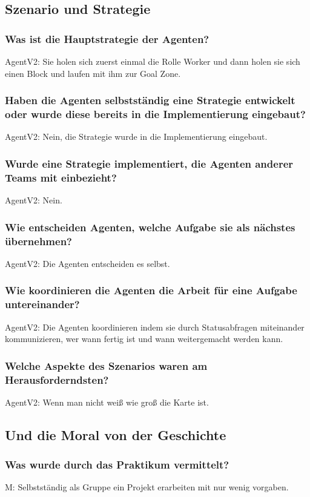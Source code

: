 \documentclass[runningheads]{llncs}
\begin{document}
\subsection{Szenario und Strategie}
\subsubsection{Was ist die Hauptstrategie der Agenten?\\}
AgentV2: Sie holen sich zuerst einmal die Rolle Worker und dann holen sie sich einen Block und laufen mit ihm zur Goal Zone.
\subsubsection{Haben die Agenten selbstständig eine Strategie entwickelt oder wurde diese bereits in die Implementierung eingebaut?\\}
AgentV2: Nein, die Strategie wurde in die Implementierung eingebaut.
\subsubsection{Wurde eine Strategie implementiert, die Agenten anderer Teams mit einbezieht?\\}
AgentV2: Nein.
\subsubsection{Wie entscheiden Agenten, welche Aufgabe sie als nächstes übernehmen?\\}
AgentV2: Die Agenten entscheiden es selbst.
\subsubsection{Wie koordinieren die Agenten die Arbeit für eine Aufgabe untereinander?\\}
AgentV2: Die Agenten koordinieren indem sie durch Statusabfragen miteinander kommunizieren, wer wann fertig ist und wann weitergemacht werden kann. 
\subsubsection{Welche Aspekte des Szenarios waren am Herausforderndsten?\\}
AgentV2: Wenn man nicht weiß wie groß die Karte ist.
\subsection{Und die Moral von der Geschichte}
\subsubsection{Was wurde durch das Praktikum vermittelt?\\}
M: Selbstständig als Gruppe ein Projekt erarbeiten mit nur wenig vorgaben.
\end{document}
